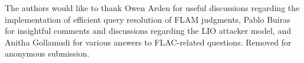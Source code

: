 \ifx\review\undefined
The authors would like to thank Owen Arden for useful discussions regarding the implementation of efficient query resolution of FLAM judgments, Pablo Buiras for insightful comments and discussions regarding the LIO attacker model, and Anitha Gollamudi for various answers to FLAC-related questions.
\else
Removed for anonymous submission.
\fi